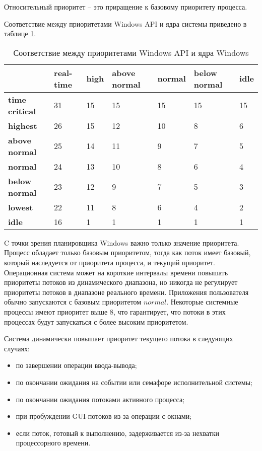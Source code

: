 Относительный приоритет -- это приращение к базовому приоритету процесса.

Соответствие между приоритетами {\ttfamily Windows API} и ядра системы приведено в таблице \ref{tbl:priority}.
\begin{table}[h]
	\caption{Соответствие между приоритетами Windows API и ядра Windows}
	\begin{center}
		\begin{tabular}{|l|p{45pt}|p{45pt}|p{45pt}|p{45pt}|p{45pt}|p{45pt}|} 
			\hline
			{} & \textbf{real-time} & \textbf{high} & \textbf{above normal} & \textbf{normal} & \textbf{below normal} & \textbf{idle}\\
			\hline
			\textbf{time critical} & 31 & 15 & 15 & 15 & 15 & 15 \\
			\hline
			\textbf{highest} & 26 & 15 & 12 & 10 & 8 & 6 \\
			\hline
			\textbf{above normal} & 25 & 14 & 11 & 9 & 7 & 5 \\
			\hline
			\textbf{normal} & 24 & 13 & 10 & 8 & 6 & 4 \\
			\hline
			\textbf{below normal} & 23 & 12 & 9 & 7 & 5 & 3 \\
			\hline
			\textbf{lowest} & 22 & 11 & 8 & 6 & 4 & 2 \\
			\hline
			\textbf{idle} & 16 & 1 & 1 & 1 & 1 & 1 \\
			\hline
		\end{tabular}
	\end{center}
	\label{tbl:priority}
\end{table}

C точки зрения планировщика Windows важно только значение приоритета.
Процесс обладает только базовым приоритетом, тогда как поток имеет базовый, который наследуется от приоритета процесса, и текущий приоритет. Операционная система может на короткие интервалы времени повышать приоритеты потоков из динамического диапазона, но никогда не регулирует приоритеты потоков в диапазоне реального времени.
Приложения пользователя обычно запускаются с базовым приоритетом $normal$. Некоторые системные процессы имеют приоритет выше 8, что гарантирует, что потоки в этих процессах будут запускаться с более высоким приоритетом.

Система динамически повышает приоритет текущего потока в следующих случаях:
\begin{itemize}
	\item по завершении операции ввода-вывода;
	\item по окончании ожидания на событии или семафоре исполнительной системы;
	\item по окончании ожидания потоками активного процесса;
	\item при пробуждении {\ttfamily GUI}-потоков из-за операции с окнами;
	\item если поток, готовый к выполнению, задерживается из-за нехватки процессорного времени.
\end{itemize}

